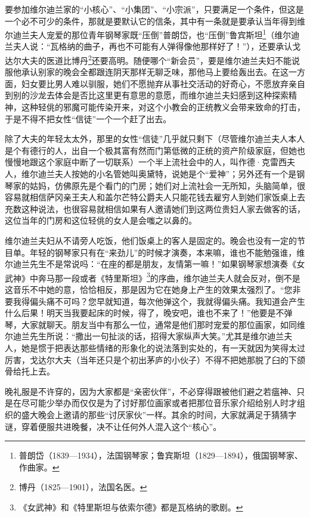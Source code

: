 \par 要参加维尔迪兰家的“小核心”、“小集团”、“小宗派”，只要满足一个条件，但这是一个必不可少的条件，那就是要默认它的信条，其中有一条就是要承认当年得到维尔迪兰夫人宠爱的那位青年钢琴家既“压倒”普朗岱，也“压倒”鲁宾斯坦\footnote{普朗岱（1839—1934），法国钢琴家；鲁宾斯坦（1829—1894），俄国钢琴家、作曲家。}（维尔迪兰夫人说：“瓦格纳的曲子，再也不可能有人弹得像他那样好了！”），还要承认戈达尔大夫的医道比博丹\footnote{博丹（1825—1901），法国名医。}还要高明。随便哪个“新会员”，要是维尔迪兰夫妇不能说服他承认别家的晚会全都跟连阴天那样无聊乏味，那他马上要给轰出去。在这一方面，妇女要比男人难以驯服，她们不愿抛弃从事社交活动的好奇心，不愿放弃亲自到别的沙龙去体会是否比这里更有意思的意愿，而维尔迪兰夫妇感到这种探索精神，这种轻佻的邪魔可能传染开来，对这个小教会的正统教义会带来致命的打击，于是不得不把女性“信徒”一个一个赶了出去。
\par 除了大夫的年轻太太外，那里的女性“信徒”几乎就只剩下（尽管维尔迪兰夫人本人是个有德行的人，出自一个极其富有然而门第低微的正统的资产阶级家庭，但她也慢慢地跟这个家庭中断了一切联系）一个半上流社会中的人，叫作德·克雷西夫人，维尔迪兰夫人按她的小名管她叫奥黛特，说她是个“爱神”；另外还有一个是钢琴家的姑妈，仿佛原先是个看门的门房；她们对上流社会一无所知，头脑简单，很容易就相信萨冈亲王夫人和盖尔芒特公爵夫人只能花钱去雇穷人到她们家饭桌上去充数这种说法，也很容易就相信如果有人邀请她们到这两位贵妇人家去做客的话，这位当年的门房和这位轻佻的女人是会嗤之以鼻的。
\par 维尔迪兰夫妇从不请旁人吃饭，他们饭桌上的客人是固定的。晚会也没有一定的节目单。年轻的钢琴家只有在“来劲儿”的时候才演奏，本来嘛，谁也不能勉强谁，维尔迪兰先生不是常说吗：“在座的都是朋友，友情第一嘛！”如果钢琴家想演奏《女武神》中奔马那一段或者《特里斯坦》\footnote{《女武神》和《特里斯坦与依索尔德》都是瓦格纳的歌剧。}的序曲，维尔迪兰夫人就会反对，倒不是这音乐不中她的意，恰恰相反，那是因为它在她身上产生的效果太强烈了。“您非要我得偏头痛不可吗？您早就知道，每次他弹这个，我就得偏头痛。我知道会产生什么后果！明天当我要起床的时候，得了，晚安吧，谁也不来了！”他要是不弹琴，大家就聊天。朋友当中有那么一位，通常是他们那时宠爱的那位画家，如同维尔迪兰先生所说：“撒出一句扯淡的话，招得大家纵声大笑。”尤其是维尔迪兰夫人，她是惯于把表达那些情绪的形象化的说法落到实处的，有一天就因为笑得太过厉害，戈达尔大夫（当年还只是个初出茅庐的小伙子）不得不把她那脱了臼的下颌骨给托上去。
\par 晚礼服是不许穿的，因为大家都是“亲密伙伴”，不必穿得跟被他们避之若瘟神、只是在尽可能少举办而仅仅是为了讨好那位画家或者把那位音乐家介绍给别人时才组织的盛大晚会上邀请的那些“讨厌家伙”一样。其余的时间，大家就满足于猜猜字谜，穿着便服共进晚餐，决不让任何外人混入这个“核心”。
